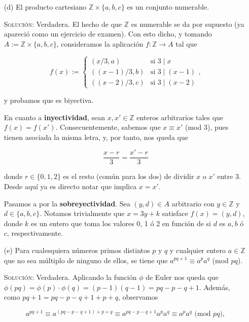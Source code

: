 \documentclass{article}
\begin{document}
\begin{enumerate}
\begin{enumerate}
        \item[(d)] El producto cartesiano $\mathbb{Z} \times \{a, b, c\}$ es un conjunto numerable.

        \textsc{Solución:} Verdadera. El hecho de que $\mathbb{Z}$ es numerable se da por supuesto (ya apareció como un ejercicio de examen). Con esto dicho, y tomando $A := \mathbb{Z} \times \{a, b, c\}$, consideramos la aplicación $f : \mathbb{Z} \longrightarrow A$ tal que 

        \[f(x) := \begin{cases}
            (x / 3, a) & \text{si }3 \mid x \\
            ((x - 1)/3, b) & \text{si }3 \mid (x - 1) \\
            ((x - 2)/3, c) & \text{si }3 \mid (x - 2) 
        \end{cases},\]

        y probamos que es biyectiva.

        En cuanto a \textbf{inyectividad}, sean $x, x' \in \mathbb{Z}$ enteros arbitrarios tales que $f(x) = f(x')$. Consecuentemente, sabemos que $x \equiv x'$ (mod 3), pues tienen asociada la misma letra, y, por tanto, nos queda que

        \[\frac{x - r}{3} = \frac{x' - r}{3}\]

        donde $r \in \{0, 1, 2\}$ es el resto (común para los dos) de dividir $x$ o $x'$ entre 3. Desde aquí ya es directo notar que implica $x = x'$.

        Pasamos a por la \textbf{sobreyectividad}. Sea $(y, d) \in A$ arbitrario con $y \in \mathbb{Z}$ y $d \in \{a, b, c\}$. Notamos trivialmente que $x = 3y + k$ satisface $f(x) = (y, d)$, donde $k$ es un entero que toma los valores 0, 1 ó 2 en función de si $d$ es $a, b$ ó $c$, respectivamente.

        \newpage

        \item[(e)] Para cualesquiera números primos distintos $p$ y $q$ y cualquier entero $a \in \mathbb{Z}$ que no sea múltiplo de ninguno de ellos, se tiene que $a^{pq+1} \equiv a^pa^q$ (mod $pq$).

        \textsc{Solución:} Verdadera. Aplicando la función $\phi$ de Euler nos queda que $\phi(pq) = \phi(p)\cdot\phi(q) = (p - 1)(q - 1) = pq - p - q + 1$. Además, como $pq + 1 = pq - p - q + 1 + p + q$, observamos

        \[a^{pq+1} \equiv a^{(pq - p - q + 1) + p + q} \equiv a^{pq-p-q+1}a^pa^q \equiv a^pa^q \text{ (mod $pq$)},\]


\end{enumerate}
\end{enumerate}
\end{document}

